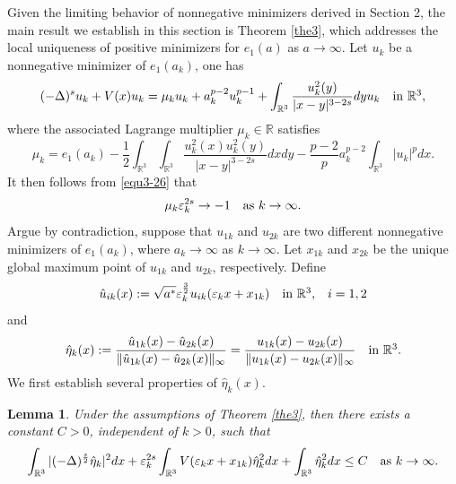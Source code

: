 \documentclass[reqno, 11pt]{amsart} %
\numberwithin{equation}{section}
\newtheorem{lemma}[theorem]{Lemma}
\begin{document}
	Given the limiting behavior of nonnegative minimizers derived in Section 2, the main result we establish in this section is Theorem \ref{the3}, which addresses the local uniqueness of positive minimizers for $e_{1}(a)$ as $a\rightarrow\infty$. Let $u_{k}$ be a nonnegative minimizer of $e_{1}(a_{k})$, one has
	\begin{equation}\label{equ4-1}
		(-\Delta)^{s} u_{k}+V(x)u_{k}=\mu_{k}u_{k}+a_{k}^{p-2}u_{k}^{p-1}+\int_{\mathbb{R}^{3}}\frac{u^{2}_{k}(y)}{|x-y|^{3-2s}}dyu_{k}\quad \hbox{in $\mathbb{R}^{3}$},
	\end{equation}
	where the associated Lagrange multiplier $\mu_{k}\in\mathbb{R}$ satisfies
	\begin{equation}\label{equ4-2}
		\mu_{k}=e_{1}(a_{k})-\frac{1}{2}\int_{\mathbb{R}^{3}}\int_{\mathbb{R}^{3}}\frac{u^{2}_{k}(x)u^{2}_{k}(y)}{|x-y|^{3-2s}}dxdy-\frac{p-2}{p}a_{k}^{p-2}\int_{\mathbb{R}^{3}}|u_{k}|^{p}dx.
	\end{equation}
	It then follows from \eqref{equ3-26} that
	\begin{equation}\label{equ4-3}
		\mu_{k}\varepsilon^{2s}_{k}\rightarrow-1\quad \hbox{as $k\rightarrow\infty$}.
	\end{equation}
	Argue by contradiction, suppose that $u_{1k}$ and $u_{2k}$  are two different nonnegative minimizers of $e_{1}(a_{k})$, where $a_{k}\rightarrow\infty$ as $k\rightarrow\infty$. Let $x_{1k}$ and $x_{2k}$ be the unique global maximum point of $u_{1k}$ and $u_{2k}$, respectively. Define
	\begin{equation}\label{equ4-4}
		\hat{u}_{ik}(x):=\sqrt{a^{\ast}}\varepsilon^{\frac{3}{2}}_{k}u_{ik}(\varepsilon_{k}x+x_{1k})\quad \hbox{in $\mathbb{R}^{3}$,\quad $i=1, 2$}
	\end{equation}
	and
	\begin{equation}\label{equ4-5}
		\hat{\eta}_{k}(x):=\frac{	\hat{u}_{1k}(x)-	\hat{u}_{2k}(x)}{\|\hat{u}_{1k}(x)-	\hat{u}_{2k}(x)\|_{\infty}}=\frac{	u_{1k}(x)-	u_{2k}(x)}{\|u_{1k}(x)-u_{2k}(x)\|_{\infty}}\quad \hbox{in $\mathbb{R}^{3}$}.
	\end{equation}
	We first establish several properties of $\hat{\eta}_{k}(x)$.
	\begin{lemma}\label{lem4-1}
		Under the assumptions of Theorem \ref{the3}, then there exists a constant $C>0$, independent
		of $k>0$, such that
		\begin{equation}\label{equ4-6}
			\int_{\mathbb{R}^{3}}|(-\Delta)^{\frac{s}{2}}\hat{\eta}_{k}|^{2}dx+\varepsilon_{k}^{2s}\int_{\mathbb{R}^{3}}V(\varepsilon_{k}x+x_{1k})\hat{\eta}_{k}^{2}dx+\int_{\mathbb{R}^{3}}\hat{\eta}_{k}^{2}dx\leq C\quad \hbox{as $k\rightarrow\infty$}.
		\end{equation}
	\end{lemma}
\end{document}
